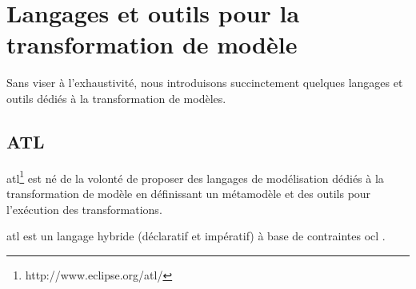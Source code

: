 \section{Langages et outils pour la transformation de modèle}
Sans viser à l'exhaustivité, nous introduisons succinctement quelques langages et outils 
dédiés à la transformation de modèles.  

\subsection{ATL}
\label{sec:ATL}
\gls{atl}\footnote{http://www.eclipse.org/atl/} est né de la volonté de proposer des langages de modélisation dédiés à la transformation de modèle en définissant un métamodèle 
et des outils pour l'exécution des transformations. 

\gls{atl} est un langage hybride (déclaratif et impératif) à base de contraintes \gls{ocl} \cite{jouault2006transforming}. 

%


